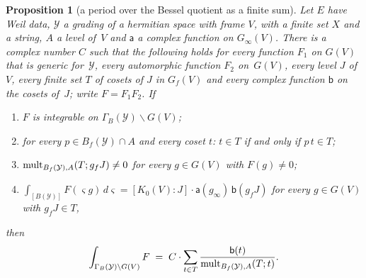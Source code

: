 \documentclass[11pt,a4paper]{article}
\newcommand{\m}[1]{\mbox{$#1$}}        %
\theoremstyle{plainx}
\newtheorem{proposition}[theorem]{Proposition}
\theoremstyle{uprightx}
\newcommand{\Kz}[1]{K_0(#1)}                       %
\newcommand{\Bes}[1]{B(#1)}                        %
\newcommand{\Besf}[1]{B_f(#1)}
\newcommand{\Besr}[1]{\Gamma_B(#1)}                %
\begin{document}
\begin{proposition}[a period over the Bessel quotient as a finite sum]\label{p:sumcut}
Let $E$ have Weil data, $\mathcal{Y}$ a grading of a hermitian space with frame $V$, with a finite set $X$ and a
string, $A$ a level of~$V$ and $\mathsf{a}$ a complex function on $G_\infty(V)$. There is a complex number $C$ such
that the following holds for every function $F_1$ on $G(V)$ that is generic for~$\mathcal{Y}$, every automorphic
function $F_2$ on~$G(V)$, every level $J$ of~$V$, every finite set $T$ of cosets of $J$ in $G_f(V)$ and every complex
function $\mathsf{b}$ on the cosets of~$J$; write \m{F=F_1F_2}. If
\begin{enumerate}[label=(\alph*)]
\item $F$ is integrable on \m{\Besr{\mathcal{Y}}\backslash G(V)};
\item for every \m{p\in\Besf{\mathcal{Y}}\cap A} and every coset $t$: \m{t\in T} if and only if \m{p\,t\in T};
\item $\cov{\Besf{\mathcal{Y}}}{A}{T}{g_fJ}\ne0$ for every \m{g\in G(V)} with \m{F(g)\ne0};
\item $\int_{[\Bes{\mathcal{Y}}]}F(\varsigma g)\,d\varsigma=[\Kz{V}:J]\cdot\mathsf{a}(g_\infty)\,\mathsf{b}(g_fJ)$ for
  every \m{g\in G(V)} with \m{g_fJ\in T},
\end{enumerate}
then
\[\int_{\Besr{\mathcal{Y}}\backslash G(V)}F\;=\;C\cdot\sum_{t\in T}\frac{\mathsf{b}(t)}{\cov{\Besf{\mathcal{Y}}}{A}{T}{t}}.\]
\end{proposition}
\end{document}

